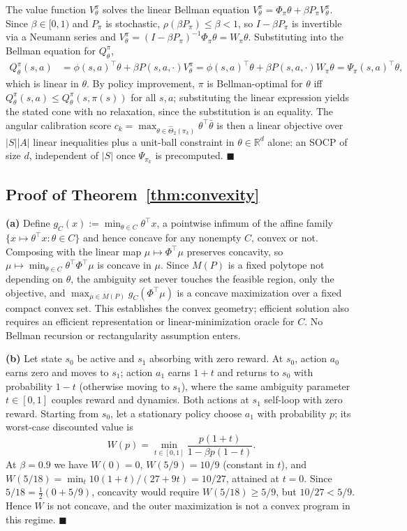 \documentclass{article}
\begin{document}
The value function $V^\pi_\theta$ solves the linear Bellman equation
$V^\pi_\theta = \Phi_\pi\theta + \beta P_\pi V^\pi_\theta$. Since
$\beta\in[0,1)$ and $P_\pi$ is stochastic, $\rho(\beta P_\pi)\le\beta<1$, so
$I-\beta P_\pi$ is invertible via a Neumann series and
$V^\pi_\theta = (I-\beta P_\pi)^{-1}\Phi_\pi\theta = W_\pi\theta$. Substituting
into the Bellman equation for $Q^\pi_\theta$,
\begin{align*}
Q^\pi_\theta(s,a) &= \phi(s,a)^\top\theta + \beta P(s,a,\cdot) V^\pi_\theta
= \phi(s,a)^\top\theta + \beta P(s,a,\cdot) W_\pi\theta
= \Psi_\pi(s,a)^\top\theta,
\end{align*}
which is linear in $\theta$. By policy improvement, $\pi$ is Bellman-optimal
for $\theta$ iff $Q^\pi_\theta(s,a)\le Q^\pi_\theta(s,\pi(s))$ for all $s,a$;
substituting the linear expression yields the stated cone with no relaxation,
since the substitution is an equality. The angular calibration score
$c_k=\max_{\theta\in\hat\Theta_2(\pi_k)}\theta^\top\bar\theta$ is then a linear
objective over $|S||A|$ linear inequalities plus a unit-ball constraint in
$\theta\in\mathbb R^d$ alone: an SOCP of size $d$, independent of $|S|$ once
$\Psi_{\pi_k}$ is precomputed. $\blacksquare$

\subsection{Proof of Theorem~\ref{thm:convexity}}
\label{app:proof-convexity}

\textbf{(a)} Define $g_C(x) := \min_{\theta\in C}\theta^\top x$, a pointwise
infimum of the affine family $\{x\mapsto\theta^\top x : \theta\in C\}$ and
hence concave for any nonempty $C$, convex or not. Composing with the linear
map $\mu\mapsto\Phi^\top\mu$ preserves concavity, so
$\mu \mapsto \min_{\theta\in C}\theta^\top\Phi^\top\mu$ is concave in $\mu$.
Since $M(P)$ is a fixed polytope not depending on $\theta$, the ambiguity set
never touches the feasible region, only the objective, and
$\max_{\mu\in M(P)} g_C(\Phi^\top\mu)$ is a concave maximization over a fixed
compact convex set. This establishes the convex geometry; efficient solution
also requires an efficient representation or linear-minimization oracle for
$C$. No Bellman recursion or rectangularity assumption enters.

\textbf{(b)} Let state $s_0$ be active and $s_1$ absorbing with zero reward.
At $s_0$, action $a_0$ earns zero and moves to $s_1$; action $a_1$ earns
$1+t$ and returns to $s_0$ with probability $1-t$ (otherwise moving to
$s_1$), where the same ambiguity parameter $t\in[0,1]$ couples reward and
dynamics. Both actions at $s_1$ self-loop with zero reward. Starting from
$s_0$, let a stationary policy choose $a_1$ with probability $p$; its
worst-case discounted value is
\[
W(p) = \min_{t\in[0,1]} \frac{p(1+t)}{1-\beta p(1-t)}.
\]
At $\beta=0.9$ we have $W(0)=0$, $W(5/9)=10/9$ (constant in $t$), and
$W(5/18)=\min_{t}10(1+t)/(27+9t)=10/27$, attained at $t=0$. Since
$5/18=\tfrac12(0+5/9)$, concavity would require $W(5/18)\ge 5/9$, but
$10/27<5/9$. Hence $W$ is not concave, and the outer maximization is not a
convex program in this regime. $\blacksquare$
\end{document}

